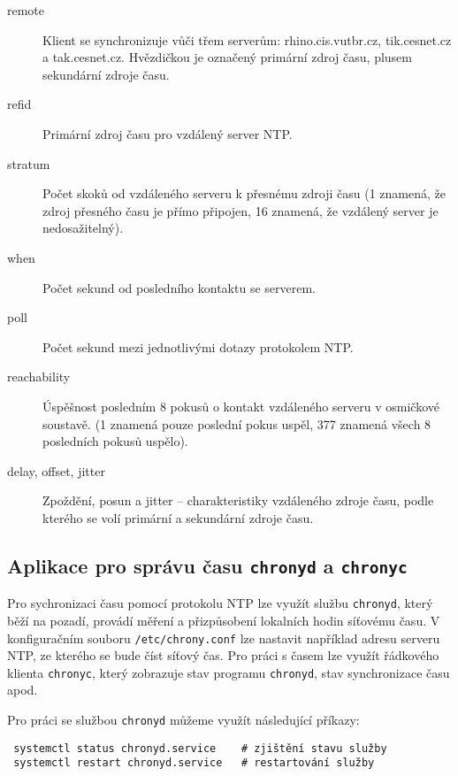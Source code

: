\begin{description}

  \item[remote] Klient se synchronizuje vůči třem serverům: rhino.cis.vutbr.cz,
    tik.cesnet.cz a tak.cesnet.cz. Hvězdičkou je označený primární zdroj času,
    plusem sekundární zdroje času.

  \item[refid] Primární zdroj času pro vzdálený server NTP.

  \item[stratum] Počet skoků od vzdáleného serveru k přesnému zdroji času (1
    znamená, že zdroj přesného času je přímo připojen, 16 znamená, že vzdálený
    server je nedosažitelný).

  \item[when] Počet sekund od posledního kontaktu se serverem.

  \item[poll] Počet sekund mezi jednotlivými dotazy protokolem NTP.

  \item[reachability] Úspěšnost posledním 8 pokusů o kontakt vzdáleného serveru
    v osmičkové soustavě. (1 znamená pouze poslední pokus uspěl, 377 znamená
    všech 8 posledních pokusů uspělo).

  \item[delay, offset, jitter] Zpoždění, posun a jitter -- charakteristiky
    vzdáleného zdroje času, podle kterého se volí primární a sekundární zdroje
    času.
\end{description}

\subsection{Aplikace pro správu času {\tt chronyd} a {\tt chronyc}}
Pro sychronizaci času pomocí protokolu NTP lze využít službu {\tt chronyd}, který běží na pozadí, provádí měření a přizpůsobení lokalních hodin síťovému času. V konfiguračním souboru {\tt /etc/chrony.conf} lze nastavit například adresu serveru NTP, ze kterého se bude číst síťový čas. Pro práci s časem lze využít řádkového klienta {\tt chronyc}, který zobrazuje stav programu {\tt chronyd}, stav synchronizace času apod.

Pro práci se službou {\tt chronyd} můžeme využít následující příkazy:
\begin{verbatim}
 systemctl status chronyd.service    # zjištění stavu služby 
 systemctl restart chronyd.service   # restartování služby
\end{verbatim}

